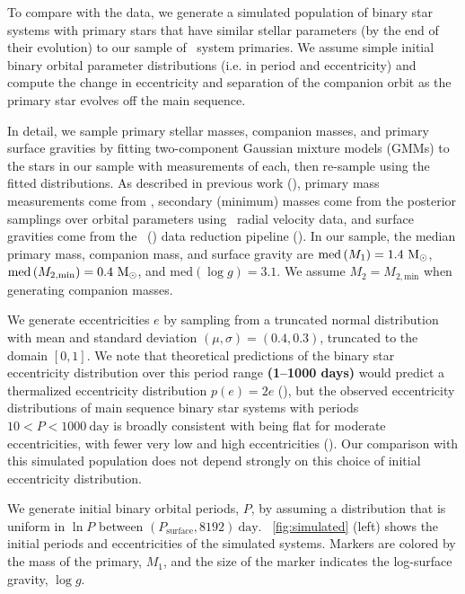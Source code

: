 \documentclass[modern, letterpaper]{aastex62}
\newcommand{\apogee}{\project{\acronym{APOGEE}}}
\newcommand{\DR}{\acronym{DR14}}
\newcommand{\logg}{\ensuremath{\log g}}
\newcommand{\med}[1]{\ensuremath{\textrm{med}\left(#1\right)}}
\newcommand{\Psurf}{\ensuremath{P_\textrm{surface}}}
\renewcommand{\changes}[1]{\textbf{#1}}
\begin{document}

To compare with the data, we generate a simulated population of binary star
systems with primary stars that have similar stellar parameters (by the end of
their evolution) to our sample of \apogee\ system primaries.
We assume simple initial binary orbital parameter distributions (i.e. in period
and eccentricity) and compute the change in eccentricity and separation of the
companion orbit as the primary star evolves off the main sequence.

In detail, we sample primary stellar masses, companion masses, and primary
surface gravities by fitting two-component Gaussian mixture models (GMMs) to the
stars in our sample with measurements of each, then re-sample using the fitted
distributions.
As described in previous work (\citealt{Price-Whelan:2018}), primary mass
measurements come from \cite{Ness:2016}, secondary (minimum) masses come from
the posterior samplings over orbital parameters using \apogee\ radial velocity
data, and surface gravities come from the \apogee\ (\DR) data reduction pipeline
(\citealt{Garcia-Perez:2016}).
In our sample, the median primary mass, companion mass, and surface gravity are
$\med{M_1} = 1.4~\msun$, $\med{M_{2, \textrm{min}}} = 0.4~\msun$, and
$\med{\logg} = 3.1$.
We assume $M_2 = M_{2, \textrm{min}}$ when generating companion masses.

We generate eccentricities $e$ by sampling from a truncated normal distribution
with mean and standard deviation $(\mu, \sigma) = (0.4, 0.3)$, truncated to the
domain $[0, 1]$.
We note that theoretical predictions of the binary star eccentricity distribution over this period range \changes{(1--1000 days)} would predict a thermalized eccentricity distribution $p(e) = 2e$ (\citealt{Jeans:1919}), but the observed eccentricity distributions of main sequence binary star systems with periods $10 < P < 1000~\textrm{day}$ is broadly consistent with being flat for moderate eccentricities, with fewer very low and high eccentricities (\citealt{Duchene:2013}).
Our comparison with this simulated population does not depend strongly on this
choice of initial eccentricity distribution.

We generate initial binary orbital periods, $P$, by assuming a distribution that
is uniform in $\ln P$ between $(\Psurf, 8192)~\textrm{day}$.
\figurename~\ref{fig:simulated} (left) shows the initial periods and
eccentricities of the simulated systems.
Markers are colored by the mass of the primary, $M_1$, and the size of the
marker indicates the log-surface gravity, \logg.
\end{document}

